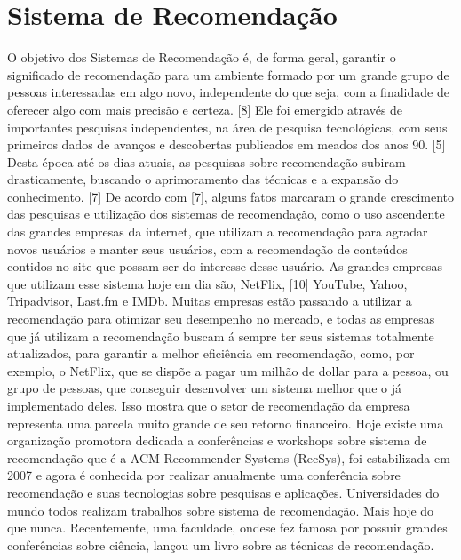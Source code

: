 \documentclass[12pt,
				openright,
				twoside,
				a4paper,
				apter=TITLE,
				section=TITLE,
				subsection=TITLE,
				chapter=TITLE,
				english,
				french,
				spanish,
				brazil]{abntex2}
\begin{document}
\chapter{Sistema de Recomendação}
O objetivo dos Sistemas de Recomendação é, de forma geral, garantir o significado de recomendação para um ambiente formado por um grande grupo de pessoas interessadas em algo novo, independente do que seja, com a finalidade de oferecer algo com mais precisão e certeza. [8] Ele foi emergido através de importantes pesquisas independentes, na área de pesquisa tecnológicas, com seus primeiros dados de avanços e descobertas publicados em meados dos anos 90. [5] Desta época até os dias atuais, as pesquisas sobre recomendação subiram drasticamente, buscando o aprimoramento das técnicas e a expansão do conhecimento. [7] 
De acordo com [7], alguns fatos marcaram o grande crescimento das pesquisas e utilização dos sistemas de recomendação, como o uso ascendente das grandes empresas da internet, que utilizam a recomendação para agradar novos usuários e manter seus usuários, com a recomendação de conteúdos contidos no site que possam ser do interesse desse usuário. As grandes empresas que utilizam esse sistema hoje em dia são, NetFlix, [10] YouTube, Yahoo, Tripadvisor, Last.fm e IMDb. Muitas empresas estão passando a utilizar a recomendação para otimizar seu desempenho no mercado, e todas as empresas que já utilizam a recomendação buscam á sempre ter seus sistemas totalmente atualizados, para garantir a melhor eficiência em recomendação, como, por exemplo, o NetFlix, que se dispõe a pagar um milhão de dollar para a pessoa, ou grupo de pessoas, que conseguir desenvolver um sistema melhor que o já implementado deles. Isso mostra que o setor de recomendação da empresa representa uma parcela muito grande de seu retorno financeiro. 
Hoje existe uma organização promotora dedicada a conferências e workshops sobre sistema de recomendação que é a ACM Recommender Systems (RecSys), foi estabilizada em 2007 e agora é conhecida por realizar anualmente uma conferência sobre recomendação e suas tecnologias sobre pesquisas e aplicações.
Universidades do mundo todos realizam trabalhos sobre sistema de recomendação. Mais hoje do que nunca. Recentemente, uma faculdade, ondese fez famosa por possuir grandes conferências sobre ciência, lançou um livro sobre as técnicas de recomendação.
\end{document}
